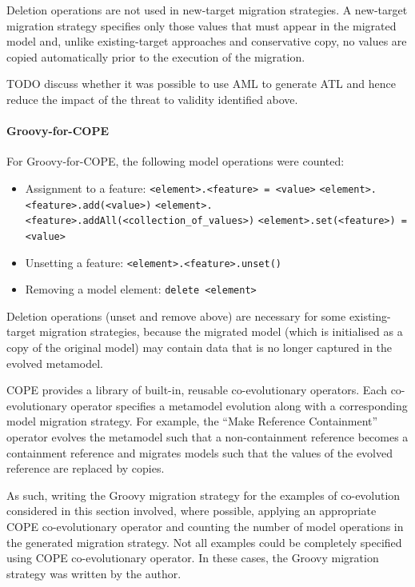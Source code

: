 Deletion operations are not used in new-target migration strategies. A new-target migration strategy specifies only those values that must appear in the migrated model and, unlike existing-target approaches and conservative copy, no values are copied automatically prior to the execution of the migration.

TODO discuss whether it was possible to use AML to generate ATL and hence reduce the impact of the threat to validity identified above.

\paragraph{Groovy-for-COPE}
For Groovy-for-COPE, the following model operations were counted:

\begin{itemize}
	\item Assignment to a feature:
	\subitem \texttt{<element>.<feature> = <value>}
	\subitem \texttt{<element>.<feature>.add(<value>)}
	\subitem \texttt{<element>.<feature>.addAll(<collection\_of\_values>)}
	\subitem \texttt{<element>.set(<feature>) = <value>}
	
	\item Unsetting a feature:
	\subitem \texttt{<element>.<feature>.unset()}	
	
	\item Removing a model element:
	\subitem \texttt{delete <element>}
\end{itemize}

Deletion operations (unset and remove above) are necessary for some existing-target migration strategies, because the migrated model (which is initialised as a copy of the original model) may contain data that is no longer captured in the evolved metamodel.

COPE provides a library of built-in, reusable co-evolutionary operators. Each co-evolutionary operator specifies a metamodel evolution along with a corresponding model migration strategy. For example, the ``Make Reference Containment'' operator evolves the metamodel such that a non-containment reference becomes a containment reference and migrates models such that the values of the evolved reference are replaced by copies.

As such, writing the Groovy migration strategy for the examples of co-evolution considered in this section involved, where possible, applying an appropriate COPE co-evolutionary operator and counting the number of model operations in the generated migration strategy. Not all examples could be completely specified using COPE co-evolutionary operator. In these cases, the Groovy migration strategy was written by the author.


